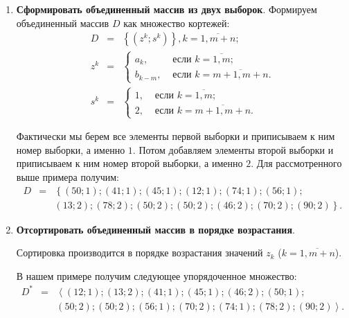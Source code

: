 \documentclass[a4paper,12pt]{article}
\begin{document}
\begin{enumerate}
\item \textbf{Сформировать объединенный массив из двух выборок}.
Формируем объединенный массив $D$ как множество кортежей:
\begin{eqnarray*}
D&=&\left\lbrace \left( z^k; s^k\right) \right\rbrace, k=\overline{1,m+n};\\
z^k&=&\left\lbrace \begin{aligned} a_k,& \text{ если } k=\overline{1,m}; \\ b_{k-m},& \text{ если } k=\overline{m+1,m+n}. \end{aligned}\right.\nonumber\\
s^k&=&\left\lbrace \begin{aligned} 1,& \text{ если } k=\overline{1,m}; \\ 2,& \text{ если } k=\overline{m+1,m+n}. \end{aligned}\right.\nonumber
\end{eqnarray*}

Фактически мы берем все элементы первой выборки и приписываем к ним номер выборки, а именно $1$. Потом добавляем элементы второй выборки и приписываем к ним номер второй выборки, а именно $2$. Для рассмотренного выше примера получим:
\begin{eqnarray*}
D&=&\left\lbrace \left( 50; 1\right) ; \left( 41; 1\right) ; \left( 45; 1\right) ; \left( 12; 1\right) ; \left( 74; 1\right) ; \left( 56; 1\right); \right. \\
 & &\left. \left( 13; 2\right) ; \left( 78; 2\right) ; \left( 50; 2\right) ; \left( 50; 2\right) ; \left( 46; 2\right) ; \left( 70; 2\right) ; \left( 90; 2\right) \right\rbrace .
\end{eqnarray*}

\item \textbf{Отсортировать объединенный массив в порядке возрастания}.

Сортировка производится в порядке возрастания значений $ z_k $ ($k=\overline{1,m+n}$).

В нашем примере получим следующее упорядоченное множество:
\begin{eqnarray*}
D^*&=&\left\langle  \left( 12; 1\right);  \left( 13; 2\right); \left( 41; 1\right) ; \left( 45; 1\right) ; \left( 46; 2\right) ;\left( 50; 1\right) ;    \right. \\
 & &\left.\left( 50; 2\right) ; \left( 50; 2\right) ; \left( 56; 1\right); \left( 70; 2\right) ;  \left( 74; 1\right) ; \left( 78; 2\right) ; \left( 90; 2\right) \right\rangle  .
\end{eqnarray*}



\end{enumerate}
\end{document}
